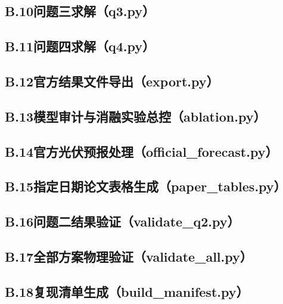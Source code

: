 \subsection*{B.10\quad 问题三求解（q3.py）}


\subsection*{B.11\quad 问题四求解（q4.py）}


\subsection*{B.12\quad 官方结果文件导出（export.py）}


\subsection*{B.13\quad 模型审计与消融实验总控（ablation.py）}


\subsection*{B.14\quad 官方光伏预报处理（official\_forecast.py）}


\subsection*{B.15\quad 指定日期论文表格生成（paper\_tables.py）}


\subsection*{B.16\quad 问题二结果验证（validate\_q2.py）}


\subsection*{B.17\quad 全部方案物理验证（validate\_all.py）}


\subsection*{B.18\quad 复现清单生成（build\_manifest.py）}


